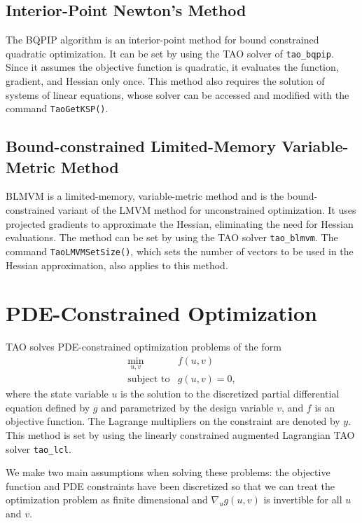 \subsection{Interior-Point Newton's Method}\label{sec:bqpip}
The BQPIP algorithm is an interior-point method for bound
constrained quadratic optimization.  It can be set by using the
TAO solver of {\tt tao\_bqpip}.
Since it assumes the objective function is quadratic, 
it evaluates the function, gradient, and Hessian only once.
This method also requires the solution of systems of linear equations,
whose solver can be accessed and modified 
with the command {\tt Tao\-Get\-KSP()}.

\subsection{Bound-constrained Limited-Memory Variable-Metric Method}
\label{sec:blmvm}

BLMVM is a limited-memory, variable-metric method and is 
the bound-constrained variant of the LMVM method for
unconstrained optimization.  It uses projected gradients to approximate
the Hessian, eliminating the need for Hessian evaluations.
The method can be set by using the TAO solver {\tt tao\_blmvm}.
The command {\tt Tao\-LMVM\-Set\-Size()}, which sets the number
of vectors to be used in the Hessian approximation, 
also applies to this method.

\section{PDE-Constrained Optimization}
\label{sec:lcl}

TAO solves PDE-constrained optimization problems of the form
\[
\begin{array}{ll}
\displaystyle \min_{u,v} & f(u,v) \\
\mbox{subject to} & g(u,v) = 0,
\end{array}
\]
where the state variable $u$ is the solution to the discretized
partial differential equation defined by $g$ and parametrized by 
the design variable $v$, and $f$ is an objective function.  The 
Lagrange multipliers on the constraint are denoted by $y$.
This method is set by using the linearly constrained augmented
Lagrangian TAO solver {\tt tao\_lcl}.

We make two main assumptions when solving these problems: the 
objective function and PDE constraints 
have been discretized so that we can treat the optimization problem 
as finite dimensional and $\nabla_u g(u,v)$ is invertible for all 
$u$ and $v$.

